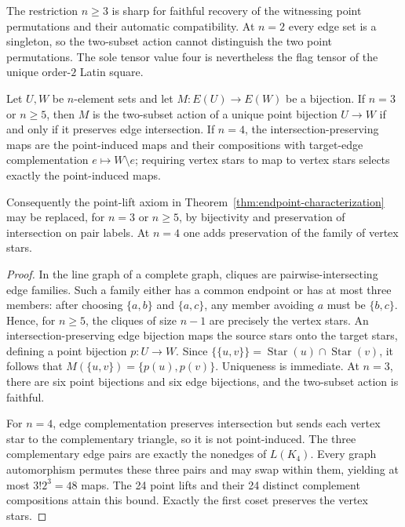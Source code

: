 The restriction $n\geq3$ is sharp for faithful recovery of the witnessing
point permutations and their automatic compatibility.  At $n=2$ every edge
set is a singleton, so the two-subset action cannot distinguish the two point
permutations.  The sole tensor value four is nevertheless the flag tensor of
the unique order-$2$ Latin square.

\begin{proposition}
\label{prop:intrinsic-edge-lift}
Let $U,W$ be $n$-element sets and let $M:E(U)\to E(W)$ be a bijection.  If
$n=3$ or $n\geq5$, then $M$ is the two-subset action of a unique point
bijection $U\to W$ if and only if it preserves edge intersection.  If $n=4$,
the intersection-preserving maps are the point-induced maps and their
compositions with target-edge complementation $e\mapsto W\setminus e$;
requiring vertex stars to map to vertex stars selects exactly the
point-induced maps.

Consequently the point-lift axiom in
Theorem~\ref{thm:endpoint-characterization} may be replaced, for $n=3$ or
$n\geq5$, by bijectivity and preservation of intersection on pair labels.
At $n=4$ one adds preservation of the family of vertex stars.
\end{proposition}

\begin{proof}
In the line graph of a complete graph, cliques are pairwise-intersecting edge
families.
Such a family either has a common endpoint or has at most three members:
after choosing $\{a,b\}$ and $\{a,c\}$, any member avoiding $a$ must be
$\{b,c\}$.  Hence, for $n\geq5$, the cliques of size $n-1$ are precisely the
vertex stars.  An intersection-preserving edge bijection maps the source
stars onto the target stars, defining a point bijection $p:U\to W$.  Since
$\{\{u,v\}\}=\operatorname{Star}(u)\cap\operatorname{Star}(v)$, it follows
that $M(\{u,v\})=\{p(u),p(v)\}$.  Uniqueness is immediate.  At $n=3$, there
are six point bijections and six edge bijections, and the two-subset action is
faithful.

For $n=4$, edge complementation preserves intersection but sends each vertex
star to the complementary triangle, so it is not point-induced.  The three
complementary edge pairs are exactly the nonedges of $L(K_4)$.  Every graph
automorphism permutes these three pairs and may swap within them, yielding at
most $3!2^3=48$ maps.  The 24 point lifts and their 24 distinct complement
compositions attain this bound.  Exactly the first coset preserves the
vertex stars.
\end{proof}

